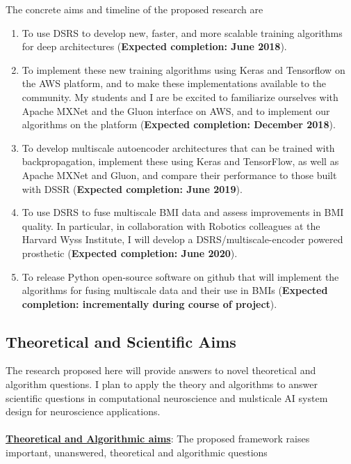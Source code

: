 \documentclass[12pt]{article}
\begin{document}
The concrete aims and timeline of the proposed research are 
\begin{enumerate}

	\item To use DSRS to develop new, faster, and more scalable training algorithms for deep architectures (\textbf{Expected completion: June 2018}).
	
	\item To implement these new training algorithms using Keras and Tensorflow on the AWS platform, and to make these implementations available to the community. My students and I are be excited to familiarize ourselves with Apache MXNet and the Gluon interface on AWS, and to implement our algorithms on the platform (\textbf{Expected completion: December 2018}).
	
	\item To develop multiscale autoencoder architectures that can be trained with backpropagation, implement these using Keras and TensorFlow, as well as Apache MXNet and Gluon, and compare their performance to those built with DSSR (\textbf{Expected completion: June 2019}).	
	
	\item To use DSRS to fuse multiscale BMI data and assess improvements in BMI quality. In particular, in collaboration with Robotics colleagues at the Harvard Wyss Institute, I will develop a DSRS/multiscale-encoder powered prosthetic (\textbf{Expected completion: June 2020}).
	
	\item To release Python open-source software on github that will implement the algorithms for fusing multiscale data and their use in BMIs (\textbf{Expected completion: incrementally during course of project}).

\end{enumerate}

\subsection*{Theoretical and Scientific Aims}

The research proposed here will provide answers to novel theoretical and algorithm questions. I plan to apply the theory and algorithms to answer scientific questions in computational neuroscience and mulsticale AI system design for neuroscience applications.
\\
\\
\noindent \textbf{\underline{Theoretical and Algorithmic aims}}: The proposed framework raises important, unanswered, theoretical and algorithmic questions 
\end{document}
